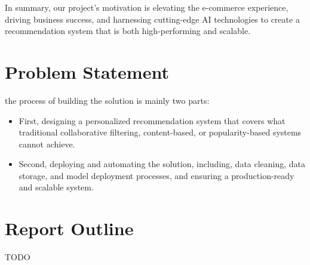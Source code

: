 In summary, our project's motivation is elevating the e-commerce experience, driving business success, and harnessing cutting-edge AI technologies to create a recommendation system that is both high-performing and scalable.

\section{Problem Statement}

the process of building the solution is mainly two parts:

\begin{itemize}
    \item First, designing a personalized recommendation system that covers what traditional collaborative filtering, content-based, or popularity-based systems cannot achieve.
    \item Second, deploying and automating the solution, including, data cleaning, data storage, and model deployment processes, and ensuring a production-ready and scalable system.
\end{itemize}



\section{Report Outline}

TODO

